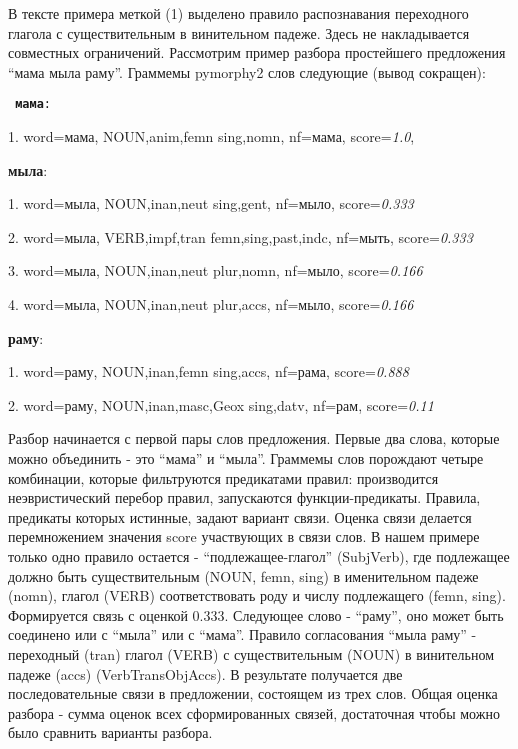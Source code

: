 \documentclass[
]{ceurart}
\begin{document}
В тексте примера меткой (1) выделено правило распознавания переходного
глагола с существительным в винительном падеже. Здесь не накладывается
совместных ограничений. Рассмотрим пример разбора простейшего
предложения ``мама мыла раму''. Граммемы pymorphy2 слов следующие (вывод
сокращен):

{\tt
\textbf{мама}:

1. word=\textquotesingle мама\textquotesingle,
\textquotesingle NOUN,anim,femn sing,nomn\textquotesingle,
nf=\textquotesingle мама\textquotesingle, score=\emph{1.0},

\textbf{мыла}:

1. word=\textquotesingle мыла\textquotesingle,
\textquotesingle NOUN,inan,neut sing,gent\textquotesingle,
nf=\textquotesingle мыло\textquotesingle, score=\emph{0.333}

2. word=\textquotesingle мыла\textquotesingle,
\textquotesingle VERB,impf,tran femn,sing,past,indc\textquotesingle,
nf=\textquotesingle мыть\textquotesingle, score=\emph{0.333}

3. word=\textquotesingle мыла\textquotesingle,
\textquotesingle NOUN,inan,neut plur,nomn\textquotesingle,
nf=\textquotesingle мыло\textquotesingle, score=\emph{0.166}

4. word=\textquotesingle мыла\textquotesingle,
\textquotesingle NOUN,inan,neut plur,accs\textquotesingle,
nf=\textquotesingle мыло\textquotesingle, score=\emph{0.166}

\textbf{раму}:

1. word=\textquotesingle раму\textquotesingle,
\textquotesingle NOUN,inan,femn sing,accs\textquotesingle,
nf=\textquotesingle рама\textquotesingle, score=\emph{0.888}

2. word=\textquotesingle раму\textquotesingle,
\textquotesingle NOUN,inan,masc,Geox sing,datv\textquotesingle,
nf=\textquotesingle рам\textquotesingle, score=\emph{0.11}
}

Разбор начинается с первой пары слов предложения. Первые два слова,
которые можно объединить - это ``мама'' и ``мыла''. Граммемы слов
порождают четыре комбинации, которые фильтруются предикатами правил:
производится неэвристический перебор правил, запускаются
функции-предикаты. Правила, предикаты которых истинные, задают вариант
связи. Оценка связи делается перемножением значения score участвующих в
связи слов. В нашем примере только одно правило остается -
``подлежащее-глагол'' (SubjVerb), где подлежащее должно быть
существительным (NOUN, femn, sing) в именительном падеже (nomn), глагол
(VERB) соответствовать роду и числу подлежащего (femn, sing).
Формируется связь с оценкой 0.333. Следующее слово - ``раму'', оно может
быть соединено или с ``мыла'' или с ``мама''. Правило согласования
``мыла раму'' - переходный (tran) глагол (VERB) с существительным (NOUN)
в винительном падеже (accs) (VerbTransObjAccs). В результате получается
две последовательные связи в предложении, состоящем из трех слов. Общая
оценка разбора - сумма оценок всех сформированных связей, достаточная
чтобы можно было сравнить варианты разбора.
\end{document}
